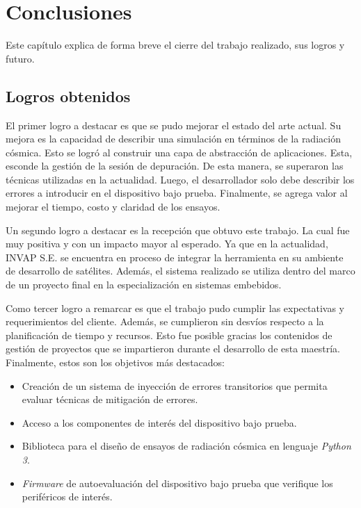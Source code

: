 \chapter{Conclusiones}
\label{Chapter5}

Este capítulo explica de forma breve el cierre del trabajo realizado, sus logros y futuro.

\section{Logros obtenidos}
\label{sec:logros}

El primer logro a destacar es que se pudo mejorar el estado del arte actual.
Su mejora es la capacidad de describir una simulación en términos de la radiación cósmica.
Esto se logró al construir una capa de abstracción de aplicaciones.
Esta, esconde la gestión de la sesión de depuración.
De esta manera, se superaron las técnicas utilizadas en la actualidad.
Luego, el desarrollador solo debe describir los errores a introducir en el dispositivo bajo prueba.
Finalmente, se agrega valor al mejorar el tiempo, costo y claridad de los ensayos.

Un segundo logro a destacar es la recepción que obtuvo este trabajo.
La cual fue muy positiva y con un impacto mayor al esperado.
Ya que en la actualidad, INVAP S.E. se encuentra en proceso de integrar la herramienta en su ambiente de desarrollo de satélites.
Además, el sistema realizado se utiliza dentro del marco de un proyecto final en la especialización en sistemas embebidos.

Como tercer logro a remarcar es que el trabajo pudo cumplir las expectativas y requerimientos del cliente.
Además, se cumplieron sin desvíos respecto a la planificación de tiempo y recursos.
Esto fue posible gracias los contenidos de gestión de proyectos que se impartieron durante el desarrollo de esta maestría.
Finalmente, estos son los objetivos más destacados:

\begin{itemize}
    \item Creación de un sistema de inyección de errores transitorios que permita evaluar técnicas de mitigación de errores.
    \item Acceso a los componentes de interés del dispositivo bajo prueba.
    \item Biblioteca para el diseño de ensayos de radiación cósmica en lenguaje \emph{Python 3}.
    \item \emph{Firmware} de autoevaluación del dispositivo bajo prueba que verifique los periféricos de interés.
\end{itemize}


